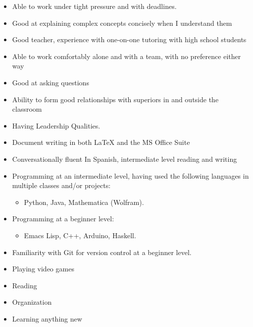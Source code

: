 



\smallskip
\begin{itemize}
\item Able to work under tight pressure and with deadlines.
\smallskip
\item Good at explaining complex concepts concisely when I understand them
\smallskip
\item Good teacher, experience with one-on-one tutoring with high school students
\smallskip
\item Able to work comfortably alone and with a team, with no preference either way
\smallskip
\item Good at asking questions
\smallskip
\item Ability to form good relationships with superiors in and outside the classroom
\smallskip
\item Having Leadership Qualities.
\end{itemize}

\smallskip
\begin{itemize}
\item Document writing in both LaTeX and the MS Office Suite
\item Conversationally fluent In Spanish, intermediate level reading and writing
\item Programming at an intermediate level, having used the following languages in multiple classes and/or projects: 
\begin{itemize} \item Python, Java, Mathematica (Wolfram). \end{itemize}
\item Programming at a beginner level: 
\begin{itemize} \item Emacs Lisp, C++, Arduino, Haskell. \end{itemize}
\item Familiarity with Git for version control at a beginner level.
\end{itemize}

\smallskip
\begin{itemize}
\item Playing video games
\smallskip
\item Reading
\smallskip
\item Organization
\smallskip
\item Learning anything new
\end{itemize}


\cvproject{}